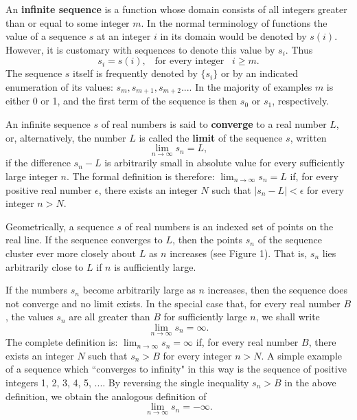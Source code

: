 An \textbf{infinite sequence} is a function whose domain consists of all integers greater than or equal to some integer $m$. In the normal terminology of functions the value of a sequence $s$ at an integer $i$ in its domain would be denoted by $s(i)$. However, it is customary with sequences to denote this value by $s_i$. Thus
$$
s_i = s(i), \;\;\; \mbox{for every integer}\;\;\; i \geq m.
$$
\noindent The sequence $s$ itself is frequently denoted by $\{s_i\}$ or by an indicated enumeration of its values: $s_m, s_{m + 1}, s_{m + 2} ...$. In the majority of examples $m$ is either 0 or 1, and the first term of the sequence is then $s_0$ or $s_1$, respectively.

An infinite sequence $s$ of real numbers is said to \textbf{converge} to a real number $L$, or, alternatively, the number $L$ is called the \textbf{limit} of the sequence $s$, written
$$
\lim_{n \rightarrow \infty} s_n = L,
$$
\noindent if the difference $s_n - L$ is arbitrarily small in absolute value for every sufficiently large integer $n$. The formal definition is therefore: $\lim_{n \rightarrow \infty} s_n = L$ if, for every positive real number $\epsilon$, there exists an integer $N$ such that $|s_n -L| < \epsilon$ for every integer $n > N$.

Geometrically, a sequence $s$ of real numbers is an indexed set of points on the real line. If the sequence converges to $L$, then the points $s_n$ of the sequence cluster ever more closely about $L$ as $n$ increases (see Figure 1). That is, $s_n$ lies arbitrarily close to $L$ if $n$ is aufficiently large.


If the numbers $s_n$ become arbitrarily large as $n$ increases, then the sequence does not converge and no limit exists. In the special case that, for every real number $B$, the values $s_n$ are all greater than $B$ for sufficiently large $n$, we shall write
$$
\lim_{n \rightarrow \infty} s_n = \infty .
$$
\noindent The complete definition is: $\lim_{n \rightarrow \infty} s_n = \infty$ if, for every real number $B$, there exists an integer $N$ such that $s_n > B$ for every integer $n > N$. A simple
example of a sequence which ``converges to infinity" in this way is the sequence of positive integers 1, 2, 3, 4, 5, .... By reversing the single inequality $s_n > B$ in the above definition, we obtain the analogous definition of 
$$
\lim_{n \rightarrow \infty} s_n = - \infty .
$$

